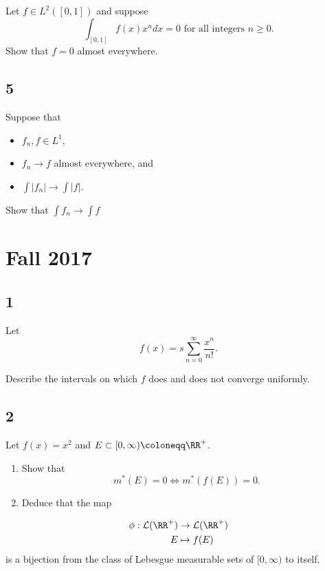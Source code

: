 Let \(f\in L^2([0, 1])\) and suppose \[
\int_{[0,1]} f(x) x^{n} d x=0 \text { for all integers } n \geq 0.
\] Show that \(f = 0\) almost everywhere.

\hypertarget{section-4}{%
\subsection{5}\label{section-4}}

Suppose that

\begin{itemize}
\tightlist
\item
  \(f_n, f \in L^1\),
\item
  \(f_n \to f\) almost everywhere, and
\item
  \(\int\left|f_{n}\right| \rightarrow \int|f|\).
\end{itemize}

Show that \(\int f_{n} \rightarrow \int f\)

\hypertarget{fall-2017}{%
\section{Fall 2017}\label{fall-2017}}

\hypertarget{section}{%
\subsection{1}\label{section}}

Let \[
f(x) = s \sum_{n=0}^{\infty} \frac{x^{n}}{n !}.
\]

Describe the intervals on which \(f\) does and does not converge
uniformly.

\hypertarget{section-1}{%
\subsection{2}\label{section-1}}

Let \(f(x) = x^2\) and \(E \subset [0, \infty) \coloneqq \RR^+\).

\begin{enumerate}
\def\labelenumi{\arabic{enumi}.}
\item
  Show that \[
  m^*(E) = 0 \iff m^*(f(E)) = 0.
  \]
\item
  Deduce that the map
\end{enumerate}

\begin{align*}
\phi: \mathcal{L}(\RR^+) &\to \mathcal{L}(\RR^+) \\
E &\mapsto f(E)
\end{align*} is a bijection from the class of Lebesgue measurable sets
of \([0, \infty)\) to itself.

